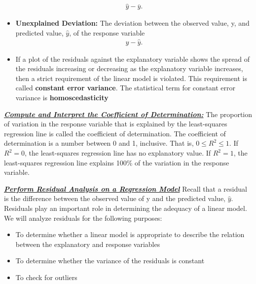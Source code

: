 \documentclass{report}
\begin{document}
\begin{itemize}
            \begin{align*}
                \hat{y}-\overline{y}
            .\end{align*}
        \item \textbf{Unexplained Deviation:} The deviation between the observed value, y, and predicted value, $\hat{y} $, of the response variable
            \begin{align*}
                y - \hat{y}
            .\end{align*}
        \item     If a plot of the residuals against the explanatory variable shows the spread of the residuals increasing or decreasing as the explanatory variable increases, then a strict requirement of the linear model is violated.     This requirement is called \textbf{constant error variance}. The statistical term for constant error variance is \textbf{homoscedasticity}

    \end{itemize}

    \bigbreak \noindent \bigbreak \noindent 
    \textbf{\textit{\underline{Compute and Interpret the Coefficient of Determination:}}}
    \bigbreak \noindent 
    The proportion of variation in the response variable that is explained by the least-squares regression line is called the coefficient of determination.
    \bigbreak \noindent 
    The coefficient of determination is a number between 0 and 1, inclusive. That is, $0 \leq R^{2} \leq 1$. If $R^{2}=0$, the least-squares regression line has no explanatory value. If $R^{2}=1$, the least-squares regression line explains 100\% of the variation in the response variable.

    \pagebreak \bigbreak \noindent
    \textbf{\textit{\underline{Perform Residual Analysis on a Regression Model}}}
    \bigbreak \noindent 
    Recall that a residual is the difference between the observed value of y and the predicted value, $\hat{y}$. Residuals play an important role in determining the adequacy of a linear model. We will analyze residuals for the following purposes:
    \begin{itemize}
        \item To determine whether a linear model is appropriate to describe the relation between the explanatory and response variables
        \item To determine whether the variance of the residuals is constant
        \item To check for outliers
    \end{itemize}
\end{document}
